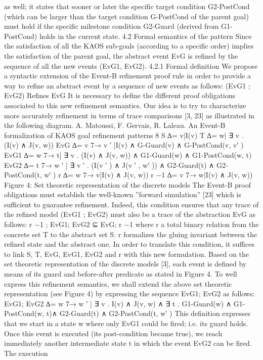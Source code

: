 as well; it states that sooner or later the specific target condition G2-PostCond (which can
be larger than the target condition G-PostCond of the parent goal) must hold if the specific
milestone condition G2-Guard (derived from G1-PostCond) holds in the current state.
4.2 Formal semantics of the pattern
Since the satisfaction of all the KAOS sub-goals (according to a specific order) implies the
satisfaction of the parent goal, the abstract event EvG is refined by the sequence of all the
new events (EvG1, EvG2).
4.2.1 Formal definition
We propose a syntactic extension of the Event-B refinement proof rule in order to provide a
way to refine an abstract event by a sequence of new events as follows:
(EvG1 ; EvG2) Refines EvG
It is necessary to define the different proof obligations associated to this new refinement
semantics. Our idea is to try to characterize more accurately refinement in terms of trace
comparisons [3, 23] as illustrated in the following diagram.
A. Matoussi, F. Gervais, R. Laleau. An Event-B formalization of KAOS goal refinement patterns 8
S
∆= {v|I(v) }
T
∆= {w| ∃ v . (I(v) ∧ J(v, w)) }
EvG ∆= {v 7→ v
′
|I(v) ∧ G-Guard(v) ∧ G-PostCond(v, v′
) }
EvG1
∆= {w 7→ t| ∃ v . (I(v) ∧ J(v, w)) ∧ G1-Guard(w) ∧ G1-PostCond(w, t) }
EvG2
∆= {t 7→ w
′
| ∃ v
′
. (I(v
′
) ∧ J(v
′
, w′
)) ∧ G2-Guard(t) ∧ G2-PostCond(t, w′
) }
r
∆= {w 7→ v|I(v) ∧ J(v, w)) }
r
−1 ∆= {v 7→ w|I(v) ∧ J(v, w)) }
Figure 4: Set theoretic representation of the discrete models
The Event-B proof obligations must establish the well-known ”forward simulation” [23]
which is sufficient to guarantee refinement. Indeed, this condition ensures that any trace of
the refined model (EvG1 ; EvG2) must also be a trace of the abstraction EvG as follows:
r
−1
; EvG1; EvG2 ⊆ EvG; r
−1
where r a total binary relation from the concrete set T to the abstract set S. r formalizes
the gluing invariant between the refined state and the abstract one. In order to translate
this condition, it suffices to link S, T, EvG, EvG1, EvG2 and r with this new formulation.
Based on the set theoretic representation of the discrete models [3], each event is defined by
means of its guard and before-after predicate as stated in Figure 4.
To well express this refinement semantics, we shall extend the above set theoretic representation (see Figure 4) by expressing the sequence EvG1; EvG2 as follows:
EvG1; EvG2
∆= {w 7→ w
′
| ∃ v . I(v) ∧ J(v, w) ∧ ∃ t . G1-Guard(w) ∧ G1-PostCond(w, t)∧
G2-Guard(t) ∧ G2-PostCond(t, w′
) }
This definition expresses that we start in a state w where only EvG1 could be fired; i.e.
its guard holds. Once this event is executed (its post-condition became true), we reach immediately another intermediate state t in which the event EvG2 can be fired. The execution
